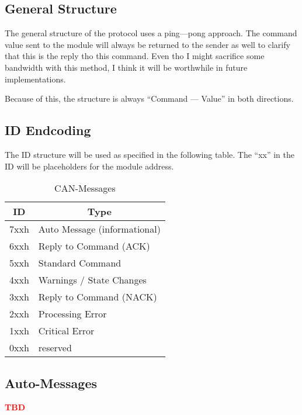 \newpage

\subsection{General Structure}
The general structure of the protocol uses a ping---pong approach. The command value sent to the module will always be returned to the sender as well to clarify that this is the reply tho this command. Even tho I might sacrifice some bandwidth with this method, I think it will be worthwhile in future implementations. 

Because of this, the structure is always ``Command --- Value'' in both directions.

\subsection{ID Endcoding}
The ID structure will be used as specified in the following table. The ``xx'' in the ID will be placeholders for the module address. 

\begin{table}[H]
    \centering
    \begin{tabular}{|c|l|}
        \hline
        \textbf{ID}   &   \multicolumn{1}{|c|}{\textbf{Type}}\\ \hline \hline
        7xxh   &   Auto Message (informational) \\ \hline
        6xxh   &   Reply to Command (ACK)  \\  \hline
        5xxh   &   Standard Command    \\ \hline
        4xxh   &   Warnings / State Changes\\ \hline
        3xxh   &   Reply to Command (NACK) \\  \hline
        2xxh   &   Processing Error    \\ \hline
        1xxh   &   Critical Error      \\ \hline
        0xxh   &   reserved \\ \hline
    \end{tabular}
    \caption{CAN-Messages}
    \label{tab:CAN-Messages}
\end{table}

\subsection{Auto-Messages}
\textbf{\textcolor[HTML]{FF0000}{TBD}}

